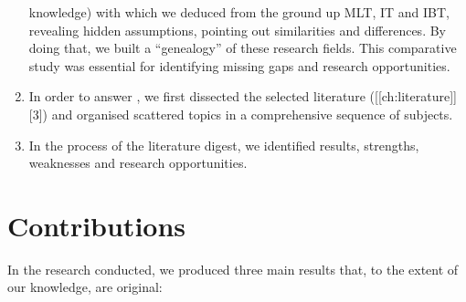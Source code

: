 \documentclass[
  letterpaper,
  12pt,
  british]{tufte-book}
\theoremstyle{plain}
\theoremstyle{definition}
\theoremstyle{plain}
\theoremstyle{remark}
\begin{document}
\begin{enumerate}
  knowledge) with which we deduced from the ground up {MLT}, {IT} and
  {IBT}, revealing hidden assumptions, pointing out similarities and
  differences. By doing that, we built a ``genealogy'' of these research
  fields. This comparative study was essential for identifying missing
  gaps and research opportunities.
\item
  In order to answer , we first dissected the selected literature
  ({[}{[}ch:literature{]}{]}{[}3{]}) and organised scattered topics in a
  comprehensive sequence of subjects.
\item
  In the process of the literature digest, we identified results,
  strengths, weaknesses and research opportunities.
\end{enumerate}

\hypertarget{contributions}{%
\section{Contributions}\label{contributions}}

In the research conducted, we produced three main results that, to the
extent of our knowledge, are original:
\end{document}

